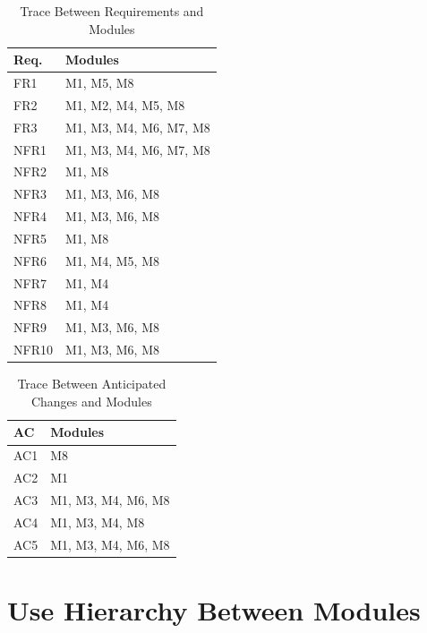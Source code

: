\documentclass[12pt, titlepage]{article}
\begin{document}
\begin{table}[H]
\centering
\begin{tabular}{p{} p{}}
\toprule
\textbf{Req.} & \textbf{Modules}\\
\midrule
FR1 & M1, M5, M8\\
FR2 & M1, M2, M4, M5, M8\\
FR3 & M1, M3, M4, M6, M7, M8\\

NFR1 & M1, M3, M4, M6, M7, M8\\
NFR2 & M1, M8\\
NFR3 & M1, M3, M6, M8\\
NFR4 & M1, M3, M6, M8\\
NFR5 & M1, M8\\
NFR6 & M1, M4, M5, M8\\
NFR7 & M1, M4\\
NFR8 & M1, M4\\
NFR9 & M1, M3, M6, M8\\
NFR10 &  M1, M3, M6, M8\\

\bottomrule
\end{tabular}
\caption{Trace Between Requirements and Modules}
\label{TblRT}
\end{table}

\begin{table}[H]
\centering
\begin{tabular}{p{} p{}}
\toprule
\textbf{AC} & \textbf{Modules}\\
\midrule
AC1 & M8\\
AC2 & M1\\
AC3 & M1, M3, M4, M6, M8\\
AC4 & M1, M3, M4, M8\\
AC5 & M1, M3, M4, M6, M8\\

\bottomrule
\end{tabular}
\caption{Trace Between Anticipated Changes and Modules}
\label{TblACT}
\end{table}


\section{Use Hierarchy Between Modules} \label{SecUse}
\end{document}
